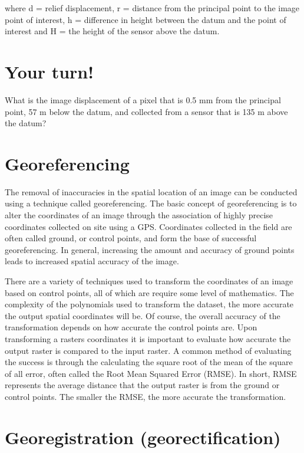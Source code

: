 \documentclass[
]{book}
\begin{document}
where d = relief displacement, r = distance from the principal point to
the image point of interest, h = difference in height between the datum
and the point of interest and H = the height of the sensor above the
datum.

\hypertarget{your-turn-8}{%
\section*{Your turn!}\label{your-turn-8}}

What is the image displacement of a pixel that is 0.5 mm from the
principal point, 57 m below the datum, and collected from a sensor that
is 135 m above the datum?

\hypertarget{georeferencing}{%
\section{\texorpdfstring{\textbf{Georeferencing}}{Georeferencing}}\label{georeferencing}}

The removal of inaccuracies in the spatial location of an image can be
conducted using a technique called georeferencing. The basic concept of
georeferencing is to alter the coordinates of an image through the
association of highly precise coordinates collected on site using a GPS.
Coordinates collected in the field are often called ground, or control
points, and form the base of successful georeferencing. In general,
increasing the amount and accuracy of ground points leads to increased
spatial accuracy of the image.

There are a variety of techniques used to transform the coordinates of
an image based on control points, all of which are require some level of
mathematics. The complexity of the polynomials used to transform the
dataset, the more accurate the output spatial coordinates will be. Of
course, the overall accuracy of the transformation depends on how
accurate the control points are. Upon transforming a rasters coordinates
it is important to evaluate how accurate the output raster is compared
to the input raster. A common method of evaluating the success is
through the calculating the square root of the mean of the square of all
error, often called the Root Mean Squared Error (RMSE). In short, RMSE
represents the average distance that the output raster is from the
ground or control points. The smaller the RMSE, the more accurate the
transformation.

\hypertarget{georegistration-georectification}{%
\section{\texorpdfstring{\textbf{Georegistration (georectification)}}{Georegistration (georectification)}}\label{georegistration-georectification}}
\end{document}
